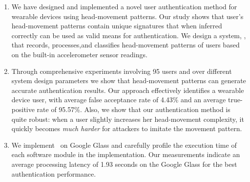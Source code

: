 \begin{enumerate}

\item We have designed and implemented a novel user authentication method for wearable devices
using head-movement patterns. Our study shows that user's head-movement patterns
contain unique signatures that when inferred correctly can be used as valid
means for authentication. We design a system, \systemname, that records, processes,and classifies
head-movement patterns of users based on the built-in accelerometer sensor readings.


\item %
Through comprehensive experiments
involving 95 users and over
different system design parameters we show that head-movement patterns
can generate accurate authentication results. Our approach effectively identifies a wearable device user, with average false
acceptance rate of 4.43\% and an average true-positive rate of 95.57\%. Also, we show that our authentication method is quite robust: when a user slightly increases her head-movement complexity, it quickly becomes \emph{much harder} for attackers to imitate the movement pattern.



\item We implement \systemname~on Google Glass and carefully profile the
execution time of each software module in the implementation. Our measurements
indicate an average processing latency of 1.93 seconds on the Google Glass for the best authentication performance.

\end{enumerate}

